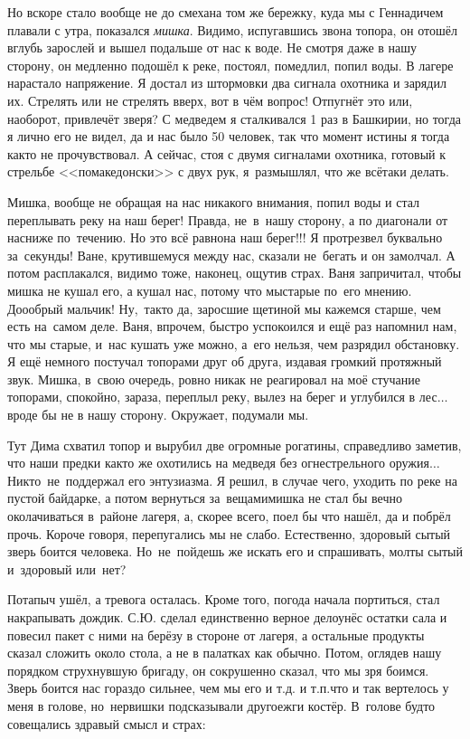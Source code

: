 Но вскоре стало вообще не до смеха\mdash на том же бережку, куда мы с Геннадичем плавали с утра, показался \textit{мишка}. Видимо, испугавшись звона топора, он отошёл вглубь зарослей и вышел подальше от нас к воде. Не смотря даже в нашу сторону, он медленно подошёл к реке, постоял, помедлил, попил воды. В лагере нарастало напряжение. Я достал из штормовки два сигнала охотника и зарядил их. Стрелять или не стрелять вверх, вот в чём вопрос! Отпугнёт это или, наоборот, привлечёт зверя? С медведем я сталкивался 1 раз в Башкирии, но тогда я лично его не видел, да и нас было 50 человек, так что момент истины я тогда как\sdash то не прочувствовал. А сейчас, стоя с двумя сигналами охотника, готовый к стрельбе <<по\sdash македонски>> с двух рук, я~размышлял, что же всё\sdash таки делать. 

Мишка, вообще не обращая на нас никакого внимания, попил воды и стал переплывать реку на наш берег! Правда, не~в~нашу сторону, а по диагонали от нас\mdash ниже по~течению. Но это всё равно\mdash на наш берег!!! Я протрезвел буквально за~секунды! Ване, крутившемуся между нас, сказали не~бегать и он замолчал. А потом расплакался, видимо тоже, наконец, ощутив страх. Ваня запричитал, чтобы мишка не кушал его, а кушал нас, потому что мы\mdash старые по~его мнению. До\sdash о\sdash о\sdash брый мальчик! Ну,~так\sdash то да, заросшие щетиной мы кажемся старше, чем есть на~самом деле. Ваня, впрочем, быстро успокоился и ещё раз напомнил нам, что мы старые, и~нас кушать уже можно, а~его нельзя, чем разрядил обстановку. Я ещё немного постучал топорами друг об друга, издавая громкий протяжный звук. Мишка, в~свою очередь, ровно никак не реагировал на моё стучание топорами, спокойно, зараза, переплыл реку, вылез на берег и углубился в лес$\ldots$ вроде бы не в нашу сторону. Окружает, подумали мы.

Тут Дима схватил топор и вырубил две огромные рогатины, справедливо заметив, что наши предки как\sdash то же охотились на медведя без огнестрельного оружия$\ldots$ Никто~не~поддержал его энтузиазма. Я решил, в случае чего, уходить по реке на пустой байдарке, а потом вернуться за~вещами\mdash мишка не стал бы вечно околачиваться в~районе лагеря, а, скорее всего, поел бы что нашёл, да и побрёл прочь. Короче говоря, перепугались мы не слабо. Естественно, здоровый сытый зверь боится человека. Но~не~пойдешь же искать его и спрашивать, мол\mdash ты сытый и~здоровый или~нет? 

Потапыч ушёл, а тревога осталась. Кроме того, погода начала портиться, стал накрапывать дождик. С.Ю. сделал единственно верное дело\mdash унёс остатки сала и повесил пакет с ними на берёзу в стороне от лагеря, а остальные продукты сказал сложить около стола, а не в палатках как обычно. Потом, оглядев нашу порядком струхнувшую бригаду, он сокрушенно сказал, что мы зря боимся. Зверь боится нас гораздо сильнее, чем мы его и т.д. и т.п.\mdash что и так вертелось у меня в голове, но~нервишки подсказывали другое\mdash жги костёр. В~голове будто совещались здравый смысл и страх:

